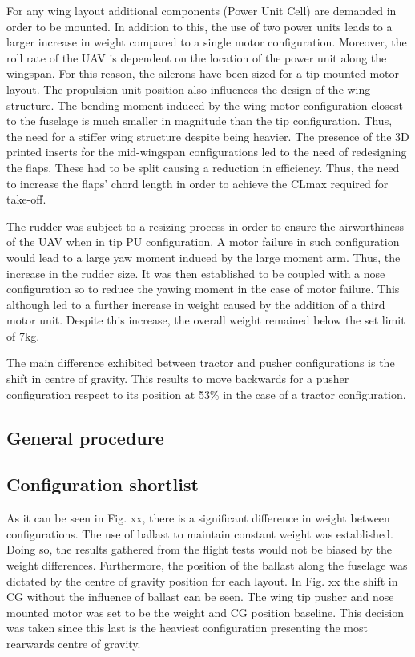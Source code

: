 \documentclass[../../main.tex]{subfiles}
\begin{document}
For any wing layout additional components (Power Unit Cell) are demanded in order to be mounted.
In addition to this, the use of two power units leads to a larger increase in weight compared to a single motor configuration.
Moreover, the roll rate of the UAV is dependent on the location of the power unit along the wingspan.
For this reason, the ailerons have been sized for a tip mounted motor layout.
The propulsion unit position also influences the design of the wing structure.
The bending moment induced by the wing motor configuration closest to the fuselage is much smaller in magnitude than the tip configuration.
Thus, the need for a stiffer wing structure despite being heavier.
The presence of the 3D printed inserts for the mid-wingspan configurations led to the need of redesigning the flaps.
These had to be split causing a reduction in efficiency.
Thus, the need to increase the flaps’ chord length in order to achieve the CLmax required for take-off. 

The rudder was subject to a resizing process in order to ensure the airworthiness of the UAV when in tip PU configuration.
A motor failure in such configuration would lead to a large yaw moment induced by the large moment arm.
Thus, the increase in the rudder size.
It was then established to be coupled with a nose configuration so to reduce the yawing moment in the case of motor failure.
This although led to a further increase in weight caused by the addition of a third motor unit.
Despite this increase, the overall weight remained below the set limit of 7kg. 

The main difference exhibited between tractor and pusher configurations is the shift in centre of gravity.
This results to move backwards for a pusher configuration respect to its position at 53\% in the case of a tractor configuration.

\subsection{General procedure} \label{sec:project-review:testing-and-evaluation:general-procedure}

\subsection{Configuration shortlist} \label{sec:project-review:testing-and-evaluation:configuration-shortlist}

As it can be seen in Fig. xx, there is a significant difference in weight between configurations.
The use of ballast to maintain constant weight was established.
Doing so, the results gathered from the flight tests would not be biased by the weight differences.
Furthermore, the position of the ballast along the fuselage was dictated by the centre of gravity position for each layout.
In Fig. xx the shift in CG without the influence of ballast can be seen.
The wing tip pusher and nose mounted motor was set to be the weight and CG position baseline.
This decision was taken since this last is the heaviest configuration presenting the most rearwards centre of gravity. 
\end{document}
